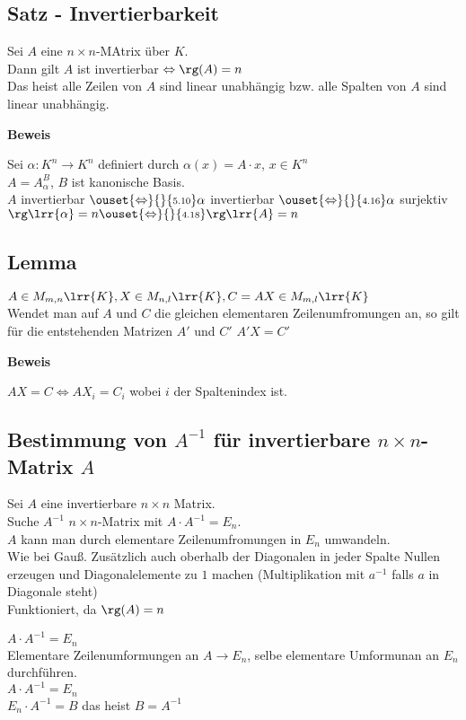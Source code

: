 \subsection{Satz - Invertierbarkeit}
	Sei $A$ eine $n\times n$-MAtrix über $K$.\\
	Dann gilt $A$ ist invertierbar $\Leftrightarrow\rg(A)=n$\\
	Das heist alle Zeilen von $A$ sind linear unabhängig bzw. alle Spalten von $A$ sind linear unabhängig.

	\textbf{Beweis}

	Sei $\alpha:K^n\rightarrow K^n$ definiert durch $\alpha(x)=A\cdot x$, $x\in K^n$\\
	$A=A_\alpha^B$, $B$ ist kanonische Basis.\\
	$A$ invertierbar $\ouset{\Leftrightarrow}{}{\mbox{\scriptsize 5.10}}\alpha$ invertierbar $\ouset{\Leftrightarrow}{}{\mbox{\scriptsize 4.16}}\alpha$ surjektiv $\rg\lrr{\alpha}=n\ouset{\Leftrightarrow}{}{\mbox{\scriptsize 4.18}}\rg\lrr{A}=n$

\subsection{Lemma}
	$A\in M_{m,n}\lrr{K}, X\in M_{n,l}\lrr{K}, C=AX\in M_{m,l}\lrr{K}$\\
	Wendet man auf $A$ und $C$ die gleichen elementaren Zeilenumfromungen an, so gilt für die entstehenden Matrizen $A'$ und $C'$ $A'X=C'$

	\textbf{Beweis}

	$AX=C\Leftrightarrow AX_i=C_i$ wobei $i$ der Spaltenindex ist.

\subsection{Bestimmung von \texorpdfstring{$A^{-1}$ für invertierbare $n\times n$- Matrix $A$}{invertierbarer Matrix}}
	Sei $A$ eine invertierbare $n\times n$ Matrix.\\
	Suche $A^{-1}$ $n\times n$-Matrix mit $A\cdot A^{-1}=E_n$.\\
	$A$ kann man durch elementare Zeilenumfromungen in $E_n$ umwandeln. \\
	Wie bei Gauß. Zusätzlich auch oberhalb der Diagonalen in jeder Spalte Nullen erzeugen und Diagonalelemente zu $1$ machen (Multiplikation mit $a^{-1}$ falls $a$ in Diagonale steht)\\
	Funktioniert, da $\rg(A)=n$

	$A\cdot A^{-1} =E_n$\\
	Elementare Zeilenumformungen an $A\rightarrow E_n$, selbe elementare Umformunan an $E_n$ durchführen.\\
	$A\cdot A^{-1} =E_n$\\
	$E_n\cdot A^{-1} = B$ das heist $B=A^{-1}$

